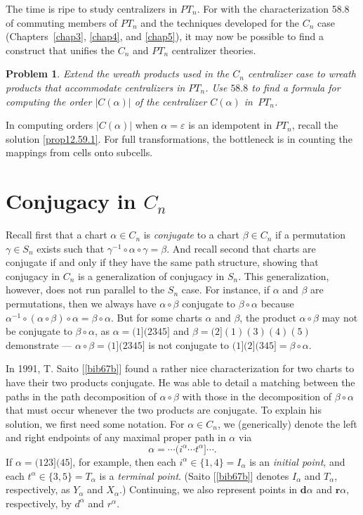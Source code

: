 \documentclass{surv-l}
\numberwithin{equation}{section}
\numberwithin{table}{section}
\numberwithin{figure}{section}
\theoremstyle{plain}
\newtheorem{problem}[equation]{Problem}
\theoremstyle{definition}
\begin{document}
The time is ripe to study centralizers in $PT_{n}$. For with the
characterization 58.8 of commuting members of $PT_{n}$ and the
techniques developed for the $C_{n}$ case (Chapters~\ref{chap3},
\ref{chap4}, and \ref{chap5}), it may now be possible to find a
construct that unifies the $C_{n}$ and $PT_{n}$ centralizer
theories.

\begin{problem}\label{prob13.62.2}
Extend the wreath products used in the $C_{n}$ centralizer case to
wreath products that accommodate centralizers in $PT_{n}$. Use
$58.8$ to find a formula for computing the order $|C(\alpha)|$ of
the centralizer $C(\alpha)$ in~$PT_{n}$.
\end{problem}

In computing orders $|C(\alpha)|$ when $\alpha=\varepsilon$ is an
idempotent in $PT_{n}$, recall the solution \ref{prop12.59.1}. For
full transformations, the bottleneck is in counting the mappings
from cells onto subcells.

\section{Conjugacy in $C_{n}$}\label{sec13.63}

Recall first that a chart $\alpha\in C_{n}$ is \emph{conjugate} to
a chart $\beta\in C_{n}$ if a permutation $\gamma\in S_{n}$ exists
such that $\gamma^{-1}\circ\alpha \circ\gamma=\beta$. And recall
second that charts are conjugate if and only if they have the same
path structure, showing that conjugacy in $C_{n}$ is a
generalization of conjugacy in $S_{n}$. This generalization,
however, does not run parallel to the $S_{n}$ case. For instance,
if $\alpha$ and $\beta$ are permutations, then we always have
$\alpha \circ\beta$ conjugate to $\beta \circ\alpha$ because
$\alpha^{-1}\circ (\alpha\circ\beta)\circ\alpha=\beta
\circ\alpha$. But for some charts $\alpha$ and $\beta$, the
product $\alpha \circ\beta$ may not be conjugate to $\beta
\circ\alpha$, as $\alpha=(1](2345]$ and $\beta=(2](1)(3)(4)(5)$
demonstrate --- $\alpha \circ\beta=(1](2345]$ is not conjugate to
$(1](2](345]=\beta\circ\alpha$.

In 1991, T. Saito
[\ref{bib67b}] found a rather nice
characterization for two charts to have their two products
conjugate. He was able to detail a matching between the paths in
the path decomposition of $\alpha \circ\beta$ with those in the
decomposition of $\beta \circ\alpha$ that must occur whenever the
two products are conjugate. To explain his solution, we first need
some notation. For $\alpha\in C_{n}$, we (generically) denote the
left and right endpoints of any maximal proper path in
$\alpha$ via
\[
\alpha=\cdots(i^{\alpha}\cdots t^{\alpha}]\cdots.
\]
If $\alpha=(123](45]$, for example, then each
$i^{\alpha}\in\{1,4\}=I_{\alpha}$ is an \emph{initial point}, and each
$t^{\alpha}\in\{3,5\}=T_{\alpha}$ is a \emph{terminal point}.
(Saito [\ref{bib67b}] denotes
$I_{\alpha}$ and $T_{\alpha}$, respectively, as $Y_{\alpha}$ and
$X_{\alpha}.$) Continuing, we also represent points in
$\mathbf{d}\alpha$ and $\mathbf{r}\alpha$, respectively, by
$d^{\alpha}$ and $r^{\alpha}$.
\end{document}
